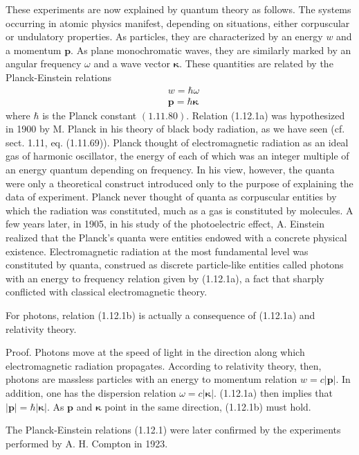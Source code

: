 \documentclass{article}
\begin{document}
These experiments are now explained by quantum theory as follows. The systems occurring in atomic physics manifest, depending on situations, either corpuscular or undulatory properties. As particles, they are characterized by an energy $w$ and a momentum $\boldsymbol{p}$. As plane monochromatic waves, they are similarly marked by an angular frequency $\omega$ and a wave vector $\boldsymbol{\kappa}$. These quantities are related by the Planck-Einstein relations
$$
\begin{align*}
& w=\hbar \omega  \tag{1.12.1a}\\
& \boldsymbol{p}=\hbar \boldsymbol{\kappa} \tag{1.12.1b}
\end{align*}
$$
where $\hbar$ is the Planck constant $(1.11 .80)$.
Relation (1.12.1a) was hypothesized in 1900 by M. Planck in his theory of black body radiation, as we have seen (cf. sect. 1.11, eq. (1.11.69)). Planck thought of electromagnetic radiation as an ideal gas of harmonic oscillator, the energy of each of which was an integer multiple of an energy quantum depending on frequency. In his view, however, the quanta were only a theoretical construct
introduced only to the purpose of explaining the data of experiment. Planck never thought of quanta as corpuscular entities by which the radiation was constituted, much as a gas is constituted by molecules. A few years later, in 1905, in his study of the photoelectric effect, A. Einstein realized that the Planck's quanta were entities endowed with a concrete physical existence. Electromagnetic radiation at the most fundamental level was constituted by quanta, construed as discrete particle-like entities called photons with an energy to frequency relation given by (1.12.1a), a fact that sharply conflicted with classical electromagnetic theory.

For photons, relation (1.12.1b) is actually a consequence of (1.12.1a) and relativity theory.

Proof. Photons move at the speed of light in the direction along which electromagnetic radiation propagates. According to relativity theory, then, photons are massless particles with an energy to momentum relation $w=c|\boldsymbol{p}|$. In addition, one has the dispersion relation $\omega=c|\boldsymbol{\kappa}|$. (1.12.1a) then implies that $|\boldsymbol{p}|=\hbar|\boldsymbol{\kappa}|$. As $\boldsymbol{p}$ and $\boldsymbol{\kappa}$ point in the same direction, (1.12.1b) must hold.

The Planck-Einstein relations (1.12.1) were later confirmed by the experiments performed by A. H. Compton in 1923.
\end{document}
